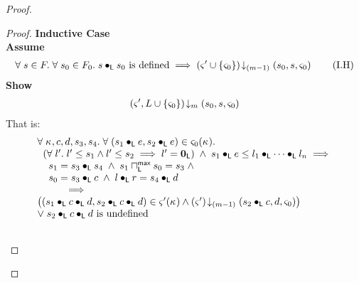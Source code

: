 \begin{lemma}[]
\begin{proof}
\begin{proof}
\noindent\textbf{Inductive Case}\\
\textbf{Assume}
\begin{align}
	\forall\; s \in F.\;\forall\; s_0 \in F_0.\; s \bullet_{\textsf{L}} s_0 \text{ is defined} \implies \left(\varsigma_{}' \cup \{\varsigma_{0}\}\right) \!\downarrow_{(m-1)} \left(s_0, s, \varsigma_{0}\right)
	\tag{I.H} \label{LAW:I.H}
\end{align}
\textbf{Show } 
%
\begin{align}
	\left(\varsigma_{}', L \cup \{\varsigma_{0}\}\right) \!\downarrow_{m} \left(s_0, s, \varsigma_{0}\right) \nonumber
\end{align}
%
That is:
%
\begin{align}
	&\begin{array}{l}
		\for{\ca{}, c, d, s_3, s_4}\for{(s_1 \composeL e, s_2 \composeL e) \in \amod{0}(\ca{})} \\
	\hspace*{0.2cm}\left(\for{l'} l' \leq s_1 \land l' \leq s_2 \implies l' = \unitL\right) \;\land\; s_1 \composeL e \leq  l_1 \composeL \cdots \composeL l_n \implies\\
	\hspace*{0.4cm} s_1 = s_3 \composeL s_4 \;\land\; s_1 \maxMeetL s_0 = s_3 \;\land\\
	\hspace*{0.4cm} s_0 = s_3 \composeL c \;\land\; l \composeL r = s_4 \composeL d \\
	\hspace*{1cm}\implies\\
	\left((s_1 \composeL c \composeL d, s_2 \composeL c \composeL d) \in \amod{}'(\ca{}) \land
	\extendsAMUpto{\amod{}'}{(m-1)}{s_2 \composeL c}{d}{\amod{0}}\right)\\
	\lor\; s_2 \composeL c \composeL d \text{ is undefined}
	\end{array} \label{LAW:Goal8} \\\nonumber\\

\end{align}
\end{proof}
\end{proof}
\end{lemma}
